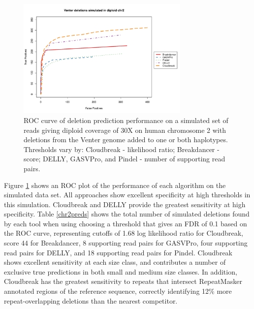 \documentclass[11pt]{article}
\begin{document}
\begin{figure}[t]
\centering
\includegraphics[width=0.75\textwidth]{CHR2SIM_ROC_NEW.pdf}
\caption{ROC curve of deletion prediction performance on a simulated set of reads giving diploid coverage of 30X on human chromosome 2 with deletions from the Venter genome added to one or both haplotypes. Thresholds vary by: Cloudbreak - likelihood ratio; Breakdancer - score; DELLY, GASVPro, and Pindel - number of supporting read pairs.}
\label{chr2roc}
\end{figure}

Figure \ref{chr2roc} shows an ROC plot of the performance of each algorithm on the simulated data set. All approaches show excellent specificity at high thresholds in this simulation. Cloudbreak and DELLY provide the greatest sensitivity at high specificity. Table \ref{chr2preds} shows the total number of simulated deletions found by each tool when using choosing a threshold that gives an FDR of 0.1 based on the ROC curve, representing cutoffs of 1.68 log likelihood ratio for Cloudbreak, score 44 for Breakdancer, 8 supporting read pairs for GASVPro, four supporting read pairs for DELLY, and 18 supporting read pairs for Pindel. Cloudbreak shows excellent sensitivity at each size class, and contributes a number of exclusive true predictions in both small and medium size classes. In addition, Cloudbreak has the greatest sensitivity to repeats that intersect RepeatMasker annotated regions of the reference sequence, correctly identifying 12\% more repeat-overlapping deletions than the nearest competitor.
\end{document}
